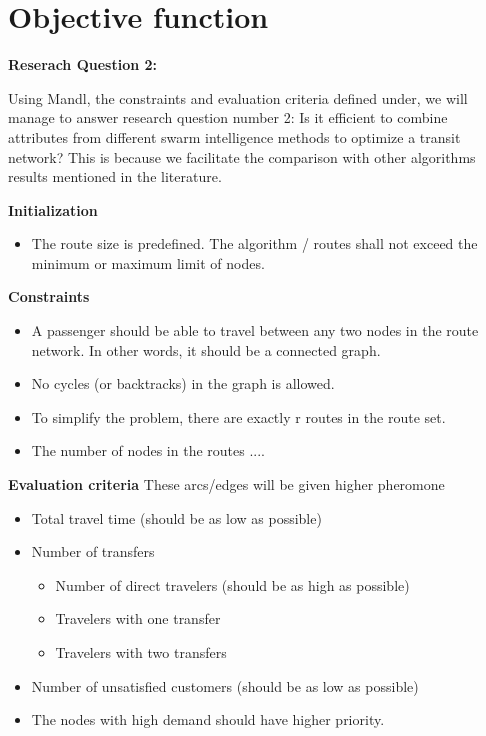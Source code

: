 \section{Objective function}
\textbf{Reserach Question 2: }

Using Mandl, the constraints and evaluation criteria defined under, we will manage to answer research question number 2: Is it efficient to combine attributes from different swarm intelligence methods to optimize a transit network? This is because we facilitate the comparison with other algorithms results mentioned in the literature. 

\textbf{Initialization}
\begin{itemize}
\item The route size is predefined. The algorithm / routes shall not exceed the minimum or maximum limit of nodes.
\end{itemize}

\textbf{Constraints}
\begin{itemize}
\item A passenger should be able to travel between any two nodes in the route network. In other words, it should be a connected graph. 
\item No cycles (or backtracks) in the graph is allowed.
\item To simplify the problem, there are exactly r routes in the route set.
\item The number of nodes in the routes .... 
\end{itemize}

\textbf{Evaluation criteria}
These arcs/edges will be given higher pheromone
\begin{itemize}
\item Total travel time (should be as low as possible)
\item Number of transfers
\begin{itemize}
\item Number of direct travelers (should be as high as possible)
\item Travelers with one transfer
\item Travelers with two transfers
\end{itemize}
\item Number of unsatisfied customers (should be as low as possible)
\item The nodes with high demand should have higher priority.
\end{itemize}

